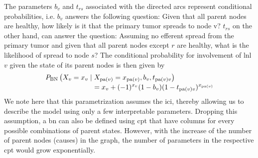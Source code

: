 \documentclass[\relativeRoot/main.tex]{subfiles}
\begin{document}
The parameters $b_v$ and $t_{rs}$ associated with the directed arcs represent conditional probabilities, i.e. $b_v$ answers the following question: Given that all parent nodes are healthy, how likely is it that the primary tumor spreads to node v? $t_{rs}$ on the other hand, can answer the question: Assuming no efferent spread from the primary tumor and given that all parent nodes except $r$ are healthy, what is the likelihood of spread to node $s$? The conditional probability for involvement of \gls{lnl} $v$ given the state of its parent nodes is then given by
%
\begin{equation} \label{eq:bn_cp}
    \begin{multlined}[0.7\textwidth]
        P_\text{BN} \left( X_v = x_v \mid X_{\pa(v)} = x_{\pa(v)}, b_v, t_{\pa(v)v} \right) \\
        = x_v + (-1)^{x_v} (1 - b_v) (1 - t_{\pa(v)v})^{x_{\pa(v)}}
    \end{multlined}
\end{equation}
%
We note here that this parametrization assumes the \gls{ici}, thereby allowing us to describe the model using only a few interpretable parameters. Dropping this assumption, a \gls{bn} can also be defined using \gls{cpt} that have columns for every possible combinations of parent states. However, with the increase of the number of parent nodes (causes) in the graph, the number of parameters in the respective \gls{cpt} would grow exponentially.
\end{document}

